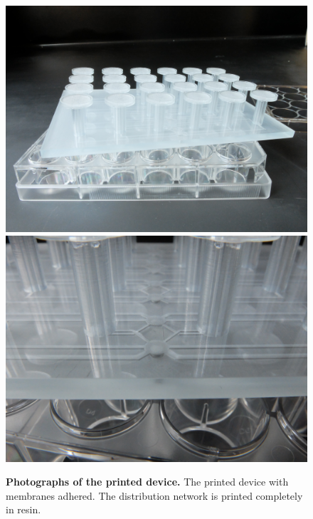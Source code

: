 \documentclass[]{article}
\begin{document}
\begin{figure}[H]
\includegraphics[scale=0.05]{../presentation-figures/24well.JPG} %
\includegraphics[scale=0.05]{../presentation-figures/printed-network.JPG} %
\caption{
{\bf Photographs of the printed device.}  The printed device with membranes adhered. The distribution network is printed completely in resin.
}
\label{device-photos-figure}
\end{figure}
\end{document}
